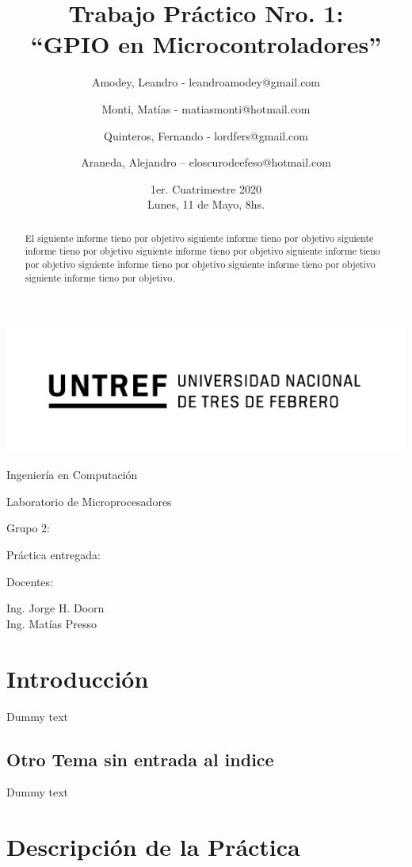 \documentclass{article}
\title{Trabajo Práctico Nro. 1:\\“GPIO en Microcontroladores”}
\author{Amodey, Leandro - leandroamodey@gmail.com
\and Monti, Matías - matiasmonti@hotmail.com
\and Quinteros, Fernando - lordfers@gmail.com
\and Araneda, Alejandro – eloscurodeefeso@hotmail.com}
\date{1er. Cuatrimestre 2020\\Lunes, 11 de Mayo, 8hs.}
\def\teacher{Ing. Jorge H. Doorn\\Ing. Matías Presso}
\begin{document}
\begin{titlepage}
\makeatletter
\centering
\includegraphics{logo.png}\par
{\Large Ingeniería en Computación \par}
\vspace{0.5cm}
{\LARGE Laboratorio de Microprocesadores \par}
\vfill
{\huge \@title \par}
\vfill
Grupo 2:\par
\begin{center}
{\renewcommand{\and}{\par}\@author}    
\end{center}
\vfill
Práctica entregada:\par
\@date
\vfill
Docentes:\par
\teacher
\vspace{1cm}
\makeatother
\end{titlepage}

\renewcommand{\abstractname}{Resumen}
\begin{abstract}
El siguiente informe tieno por objetivo siguiente informe tieno por objetivo siguiente informe tieno por objetivo siguiente informe tieno por objetivo siguiente informe tieno por objetivo siguiente informe tieno por objetivo siguiente informe tieno por objetivo siguiente informe tieno por objetivo.
\end{abstract}

\section{Introducción}
Dummy text

\subsection*{Otro Tema sin entrada al indice}
Dummy text

\section{Descripción de la Práctica}
\end{document}
